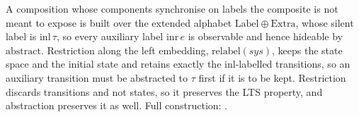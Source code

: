 \begin{definition}
  \label{def:relabel}
  \leanok
  A composition whose components synchronise on labels the composite is not meant to expose is built over the extended alphabet $\mathrm{Label} \oplus \mathrm{Extra}$, whose silent label is $\mathrm{inl}\,\tau$, so every auxiliary label $\mathrm{inr}\,e$ is observable and hence hideable by $\mathrm{abstract}$.
  Restriction along the left embedding, $\mathrm{relabel}(sys)$, keeps the state space and the initial state and retains exactly the $\mathrm{inl}$-labelled transitions, so an auxiliary transition must be abstracted to $\tau$ first if it is to be kept.
  Restriction discards transitions and not states, so it preserves the LTS property, and abstraction preserves it as well.
  Full construction: .
\end{definition}
